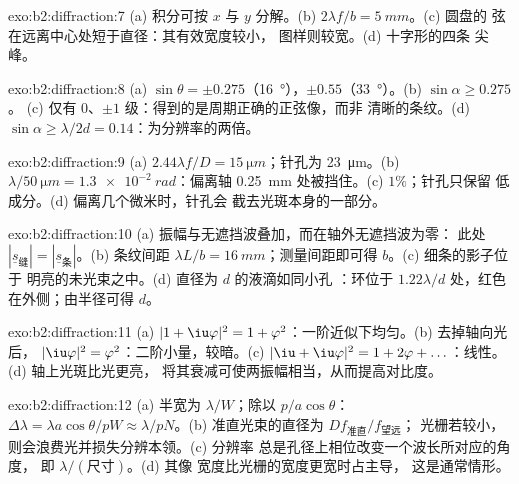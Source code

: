 \begin{solution}{exo:b2:diffraction:7}
(a) 积分可按 $x$ 与 $y$ 分解。(b) $2\lambda f/b = \qty{5}{mm}$。(c) 圆盘的
弦在远离中心处短于直径：其有效宽度较小，
图样则较宽。(d) 十字形的四条
尖峰。
\end{solution}

\begin{solution}{exo:b2:diffraction:8}
(a) $\sin\theta = \pm0.275$（\qty{16}{\degree}），$\pm0.55$（\qty{33}{\degree}）。(b) $\sin\alpha \ge 0.275$。
(c) 仅有 $0$、$\pm1$ 级：得到的是周期正确的正弦像，而非
清晰的条纹。(d) $\sin\alpha \ge \lambda/2d = 0.14$：为分辨率的两倍。
\end{solution}

\begin{solution}{exo:b2:diffraction:9}
(a) $2.44\lambda f/D = \qty{15}{\micro m}$；针孔为 \qty{23}{\micro m}。(b) $\lambda/\qty{50}{\micro m} =
\qty{1.3e-2}{rad}$：偏离轴 \qty{0.25}{mm} 处被挡住。(c) $1\%$；针孔只保留
低成分。(d) 偏离几个微米时，针孔会
截去光斑本身的一部分。
\end{solution}

\begin{solution}{exo:b2:diffraction:10}
(a) 振幅与无遮挡波叠加，而在轴外无遮挡波为零：
此处 $|\underline s_{\text{缝}}| = |\underline s_{\text{条}}|$。(b) 条纹间距 $\lambda L/b =
\qty{16}{mm}$；测量间距即可得 $b$。(c) 细条的影子位于
明亮的未光束之中。(d) 直径为 $d$ 的液滴如同小孔
：环位于 $1.22\lambda/d$ 处，红色在外侧；由半径可得 $d$。
\end{solution}

\begin{solution}{exo:b2:diffraction:11}
(a) $|1 + \iu\varphi|^2 = 1 + \varphi^2$：一阶近似下均匀。(b) 去掉轴向光后，
$|\iu\varphi|^2 = \varphi^2$：二阶小量，较暗。(c) $|\iu + \iu\varphi|^2 =
1 + 2\varphi + \dots$：线性。(d) 轴上光斑比光更亮，
将其衰减可使两振幅相当，从而提高对比度。
\end{solution}

\begin{solution}{exo:b2:diffraction:12}
(a) 半宽为 $\lambda/W$；除以 $p/a\cos\theta$：$\Delta\lambda = \lambda a\cos\theta/pW \approx
\lambda/pN$。(b) 准直光束的直径为 $Df_{\text{准直}}/f_{\text{望远}}$；
光栅若较小，则会浪费光并损失分辨本领。(c) 分辨率
总是孔径上相位改变一个波长所对应的角度，
即 $\lambda/(\text{尺寸})$。(d) 其像
宽度比光栅的宽度更宽时占主导，
这是通常情形。
\end{solution}

